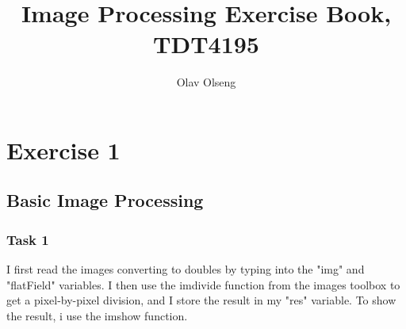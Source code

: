 \documentclass{article}
\begin{document}
\title{Image Processing Exercise Book, TDT4195}
\author{Olav Olseng}
\maketitle
\newpage


\section{Exercise 1}
\subsection{Basic Image Processing}
\subsubsection*{Task 1}
I first read the images converting to doubles by typing into the "img" and "flatField" variables. I then use the imdivide function from the images toolbox to get a pixel-by-pixel division, and I store the result in my "res" variable. To show the result, i use the imshow function.
\end{document}
